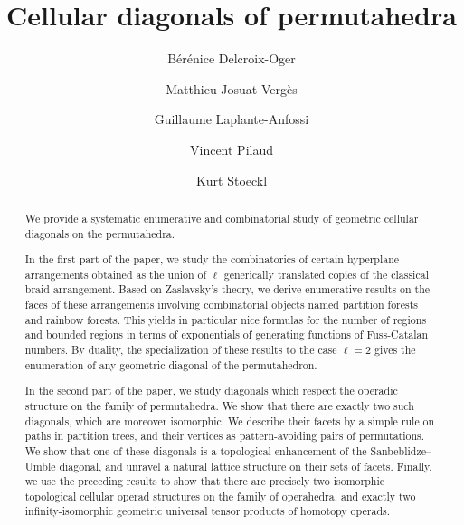 \documentclass{amsart}
\title{Cellular diagonals of permutahedra}
\author[B. Delcroix-Oger]{B\'er\'enice Delcroix-Oger}
\author[M. Josuat-Verg\`es]{Matthieu Josuat-Verg\`es}
\author[G. Laplante-Anfossi]{Guillaume Laplante-Anfossi}
\author[V. Pilaud]{Vincent Pilaud}
\author[K. Stoeckl]{Kurt Stoeckl}
\newcommand{\Guillaume}[1]{\todo[color=magenta!30]{\rm #1 \\ \hfill --- G.}}
\theoremstyle{definition}
\begin{document}
\begin{abstract}
We provide a systematic enumerative and combinatorial study of geometric cellular diagonals on the permutahedra. 

In the first part of the paper, we study the combinatorics of certain hyperplane arrangements obtained as the union of $\ell$ generically translated copies of the classical braid arrangement.
Based on Zaslavsky's theory, we derive enumerative results on the faces of these arrangements involving combinatorial objects named partition forests and rainbow forests.
This yields in particular nice formulas for the number of regions and bounded regions in terms of exponentials of generating functions of Fuss-Catalan numbers.
By duality, the specialization of these results to the case $\ell = 2$ gives the enumeration of any geometric diagonal of the permutahedron.

In the second part of the paper, we study diagonals which respect the operadic structure on the family of permutahedra.
We show that there are exactly two such diagonals, which are moreover isomorphic.
We describe their facets by a simple rule on paths in partition trees, and their vertices as pattern-avoiding pairs of permutations.
We show that one of these diagonals is a topological enhancement of the Sanbeblidze--Umble diagonal, and unravel a natural lattice structure on their sets of facets.
Finally, we use the preceding results to show that there are precisely two isomorphic topological cellular operad structures on the family of operahedra, and exactly two infinity-isomorphic geometric universal tensor products of homotopy operads.
\end{abstract}

\vspace*{-1.2cm}
\maketitle
\end{document}

